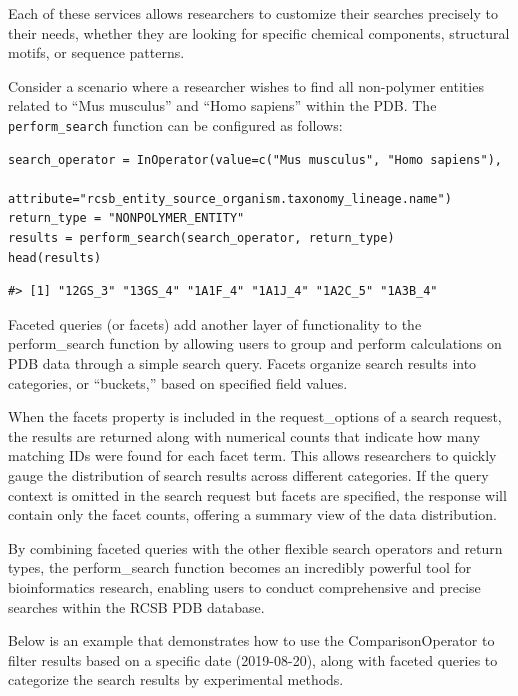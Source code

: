 Each of these services allows researchers to customize their searches precisely to their needs, whether they are looking for specific chemical components, structural motifs, or sequence patterns.

Consider a scenario where a researcher wishes to find all non-polymer entities related to ``Mus musculus'' and ``Homo sapiens'' within the PDB. The \texttt{perform\_search} function can be configured as follows:

\begin{verbatim}
search_operator = InOperator(value=c("Mus musculus", "Homo sapiens"),
                             attribute="rcsb_entity_source_organism.taxonomy_lineage.name")
return_type = "NONPOLYMER_ENTITY"
results = perform_search(search_operator, return_type)
head(results)
\end{verbatim}

\begin{verbatim}
#> [1] "12GS_3" "13GS_4" "1A1F_4" "1A1J_4" "1A2C_5" "1A3B_4"
\end{verbatim}

Faceted queries (or facets) add another layer of functionality to the perform\_search function by allowing users to group and perform calculations on PDB data through a simple search query. Facets organize search results into categories, or ``buckets,'' based on specified field values.

When the facets property is included in the request\_options of a search request, the results are returned along with numerical counts that indicate how many matching IDs were found for each facet term. This allows researchers to quickly gauge the distribution of search results across different categories. If the query context is omitted in the search request but facets are specified, the response will contain only the facet counts, offering a summary view of the data distribution.

By combining faceted queries with the other flexible search operators and return types, the perform\_search function becomes an incredibly powerful tool for bioinformatics research, enabling users to conduct comprehensive and precise searches within the RCSB PDB database.

Below is an example that demonstrates how to use the ComparisonOperator to filter results based on a specific date (2019-08-20), along with faceted queries to categorize the search results by experimental methods.

